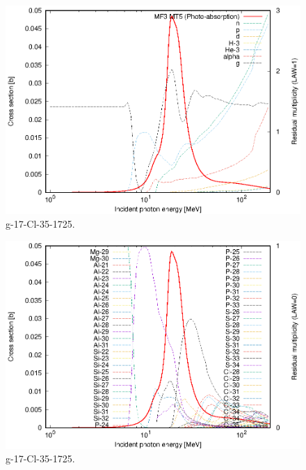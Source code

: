 \begin{figure}
 \includegraphics[width=\linewidth]{eps/g_17-Cl-35_1725.eps}
  \caption{g-17-Cl-35-1725.}
\end{figure}
\begin{figure}
 \includegraphics[width=\linewidth]{eps-law0/g_17-Cl-35_1725.eps}
 \caption{g-17-Cl-35-1725.}
\end{figure}
\newpage \clearpage

